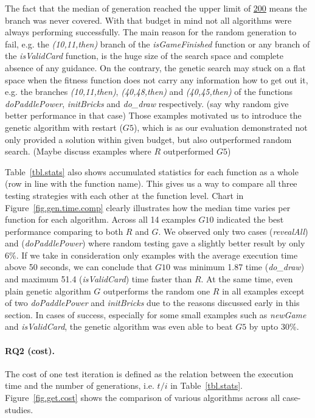 \documentclass[sigconf]{acmart}
\begin{document}
The fact that the median of generation reached the upper limit of \underline{200} means the branch was never covered. With that budget in mind not all algorithms were always performing successfully. The main reason for the random generation to fail, e.g. the \emph{(10,11,then)} branch of the \emph{isGameFinished} function or any branch of the \emph{isValidCard} function, is the huge size of the search space and complete absence of any guidance. On the contrary, the genetic search may stuck on a flat space when the fitness function does not carry any information how to get out it, e.g. the branches \emph{(10,11,then)}, \emph{(40,48,then)} and \emph{(40,45,then)} of the functions \emph{doPaddlePower}, \emph{initBricks} and \emph{do_draw} respectively. (say why random give better performance in that case) Those examples motivated us to introduce the genetic algorithm with restart ($G5$), which is as our evaluation demonstrated not only provided a solution within given budget, but also outperformed random search. (Maybe discuss examples where $R$ outperformed $G5$)

Table~\ref{tbl.stats} also shows accumulated statistics for each function as a whole (row in line with the function name). This gives us a way to compare  all three testing strategies with each other at the function level. Chart in Figure~\ref{fig.gen.time.comp} clearly illustrates how the median time varies per function for each algorithm. Across all 14 examples $G10$ indicated the best performance comparing to both $R$ and $G$. We observed only two cases (\emph{revealAll}) and (\emph{doPaddlePower}) where random testing gave a slightly better result by only 6\%. If we take in consideration only examples with the average execution time above 50 seconds, we can conclude that $G10$ was minimum 1.87 time (\emph{do_draw}) and maximum 51.4 (\emph{isValidCard}) time faster than $R$. At the same time, even plain genetic algorithm $G$ outperforms the random one $R$ in all examples except of two \emph{doPaddlePower} and \emph{initBricks} due to the reasons discussed early in this section. In cases of success, especially for some small examples such as \emph{newGame} and \emph{isValidCard}, the genetic algorithm was even able to beat $G5$ by upto 30\%.  

\paragraph{\textbf{RQ2 (cost).}} The cost of one test iteration is defined as the relation between the execution time and the number of generations, i.e. $t/i$ in Table~\ref{tbl.stats}. Figure~\ref{fig.get.cost} shows the comparison of various algorithms across all case-studies. 
\end{document}
